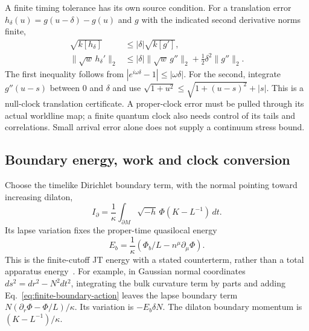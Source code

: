 \documentclass[12pt,a4paper]{article}
\begin{document}
A finite timing tolerance has its own source condition. For a translation
error $h_\delta(u)=g(u-\delta)-g(u)$ and $g$ with the indicated second
derivative norms finite,
\begin{align}
 \sqrt{k[h_\delta]}&\le|\delta|\sqrt{k[g']},\nonumber\\
 \|\sqrt w\,h_\delta'\|_2&\le
 |\delta|\|\sqrt w\,g''\|_2+\tfrac12\delta^2\|g''\|_2.
 \label{eq:clock-source-tolerance}
\end{align}
The first inequality follows from $|e^{i\omega\delta}-1|\le|\omega\delta|$.
For the second, integrate $g''(u-s)$ between $0$ and $\delta$ and use
$\sqrt{1+u^2}\le\sqrt{1+(u-s)^2}+|s|$.
This is a null-clock translation certificate. A proper-clock error must be
pulled through its actual worldline map; a finite quantum clock also needs
control of its tails and correlations. Small arrival error alone does not
supply a continuum stress bound.

\subsection{Boundary energy, work and clock conversion}
\label{sec:boundary-work}

Choose the timelike Dirichlet boundary term, with the normal pointing toward
increasing dilaton,
\begin{equation}\label{eq:finite-boundary-action}
 I_\partial=\frac1\kappa\int_{\partial M}
         \sqrt{-h}\,\Phi(K-L^{-1})\,dt .
\end{equation}
Its lapse variation fixes the proper-time quasilocal energy
\[
 E_b=\frac1\kappa(\Phi_b/L-n^\mu\partial_\mu\Phi).
\]
This is the finite-cutoff JT energy with a stated counterterm, rather than
a total apparatus energy~\cite[Sec.~6]{Griguolo2026Cutoff}.
For example, in Gaussian normal coordinates $ds^2=dr^2-N^2dt^2$,
integrating the bulk curvature term by parts and adding
Eq.~\eqref{eq:finite-boundary-action} leaves the lapse boundary term
$N(\partial_r\Phi-\Phi/L)/\kappa$. Its variation is $-E_b\delta N$.
The dilaton boundary momentum is $(K-L^{-1})/\kappa$.
\end{document}
